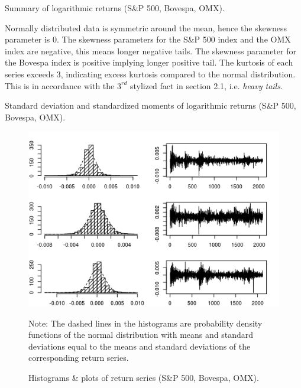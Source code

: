 \documentclass[12pt, letterpaper]{amsart}%
\begin{document}
\begin{table}[h]%
\centering
\caption{Summary of logarithmic returns (S\&P 500, Bovespa, OMX).}
\end{table}

Normally distributed data is symmetric around the mean, hence the skewness parameter is 0. The skewness parameters for the S\&P 500 index and the OMX index are negative, this means longer negative tails. The skewness parameter for the Bovespa index is positive implying longer positive tail. The kurtosis of each series exceeds 3, indicating excess kurtosis compared to the normal distribution. This is in accordance with the $3^{rd}$ stylized fact in section 2.1, i.e. \textit{heavy tails}.

\begin{table}[h]%
\centering
\caption{Standard deviation and standardized moments of logarithmic returns (S\&P 500, Bovespa, OMX).}
\end{table}

\begin{figure}[h]%
\caption{Histograms \& plots of return series (S\&P 500, Bovespa, OMX).}
\centering
\includegraphics[scale=1]{data2.png}
	\begin{tablenotes}
	\small
	\item Note: The dashed lines in the histograms are probability density functions of the normal distribution with means and standard deviations equal to the means and standard deviations of the corresponding return series.
	\end{tablenotes}
\end{figure}
\end{document}
